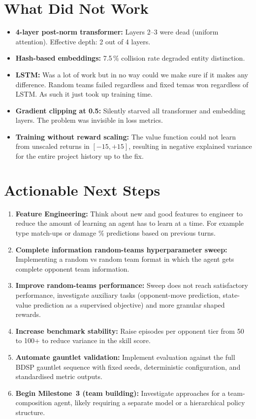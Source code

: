 \section{What Did Not Work}

\begin{itemize}
  \item \textbf{4-layer post-norm transformer:} Layers 2--3 were dead (uniform
        attention).  Effective depth: 2 out of 4 layers.
  \item \textbf{Hash-based embeddings:} 7.5\,\% collision rate degraded entity
        distinction.
  \item \textbf{LSTM:} Was a lot of work but in no way could we make sure if it makes any difference. Random teams failed regardless and fixed temas won regardless of LSTM. As such it just took up training time.
  \item \textbf{Gradient clipping at 0.5:} Silently starved all transformer
        and embedding layers.  The problem was invisible in loss metrics.
  \item \textbf{Training without reward scaling:} The value function could not
        learn from unscaled returns in $[-15,+15]$, resulting in negative
        explained variance for the entire project history up to the fix.
\end{itemize}

\section{Actionable Next Steps}

\begin{enumerate}
  \item \textbf{Feature Engineering:} Think about new and good features to engineer to reduce the amount of learning an agent has to learn at a time. For example type match-ups or damage \% predictions based on previous turns.
  \item \textbf{Complete information random-teams hyperparameter sweep:} Implementing a random vs random team format in which the agent gets complete opponent team information.
  \item \textbf{Improve random-teams performance:} Sweep does not reach
        satisfactory performance, investigate auxiliary tasks (opponent-move
        prediction, state-value prediction as a supervised objective) and
        more granular shaped rewards.

  \item \textbf{Increase benchmark stability:} Raise episodes per opponent
        tier from 50 to 100+ to reduce variance in the skill score.

  \item \textbf{Automate gauntlet validation:} Implement evaluation against
        the full BDSP gauntlet sequence with fixed seeds, deterministic
        configuration, and standardised metric outputs.

  \item \textbf{Begin Milestone~3 (team building):} Investigate approaches
        for a team-composition agent, likely requiring a separate model or a
        hierarchical policy structure.
\end{enumerate}

